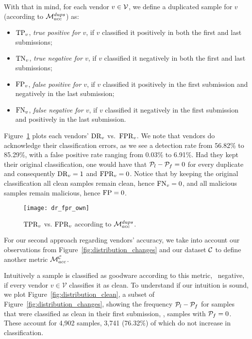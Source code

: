 With that in mind, for each vendor $v\in\mathcal{V}$, we define a duplicated sample for $v$ (according to $\mathcal{M}_{acc}^{{dups}}$) as:
\begin{itemize}%
	\item $\textrm{TP}_v$, \emph{true positive for $v$}, if $v$ classified it positively in both the first and last submissions;
	\item $\textrm{TN}_v$, \emph{true negative for $v$}, if $v$ classified it negatively in both the first and last submissions;
	\item $\textrm{FP}_v$, \emph{false positive for $v$}, if $v$ classified it positively in the first submission and negatively in the last submission;
	\item $\textrm{FN}_v$, \emph{false negative for $v$}, if $v$ classified it negatively in the first submission and positively in the last submission.
\end{itemize}

Figure~\ref{fig:dr_fpr_own} plots each vendors' $\textrm{DR}_v$ vs.\ $\textrm{FPR}_v$. We note that vendors do acknowledge their classification errors, as we see a detection rate from 56.82\% to 85.29\%, with a false positive rate ranging from 0.03\% to 6.91\%. 
Had they kept their original classification, one would have that $\mathcal{P}_{l}-\mathcal{P}_{f} = 0$ for every duplicate and consequently $\textrm{DR}_v = 1$ and $\textrm{FPR}_v = 0$. 
Notice that by keeping the original classification all clean samples remain clean, hence $\textrm{FN}_v=0$, and all malicious samples remain malicious, hence $\textrm{FP}=0$.

\begin{figure}[!h]
	\centering
	\texttt{[image: dr\_fpr\_own]}
	\caption{$\textrm{TPR}_v$ vs. $\textrm{FPR}_v$ according to $\mathcal{M}_{acc}^{{dups}}$.}
	\label{fig:dr_fpr_own}
\end{figure}

\medskip

For our second approach regarding vendors' accuracy, we take into account our observations from Figure~\ref{fig:distribution_changes} and our dataset $\mathcal{C}$ to define another metric $\mathcal{M}_{acc}^{\mathcal{C}}$.

Intuitively a sample is classified as goodware according to this metric, \ie\ negative, if every vendor $v\in\mathcal{V}$ classifies it as clean.
To understand if our intuition is sound, we plot Figure~\ref{fig:distribution_clean}, a subset of Figure~\ref{fig:distribution_changes}, showing the frequency $\mathcal{P}_{l}-\mathcal{P}_{f}$ for samples that were classified as clean in their first submission, \ie, samples with $\mathcal{P}_{f}=0$. 
These account for 4,902 samples, 3,741 (76.32\%) of which do not increase in classification.

